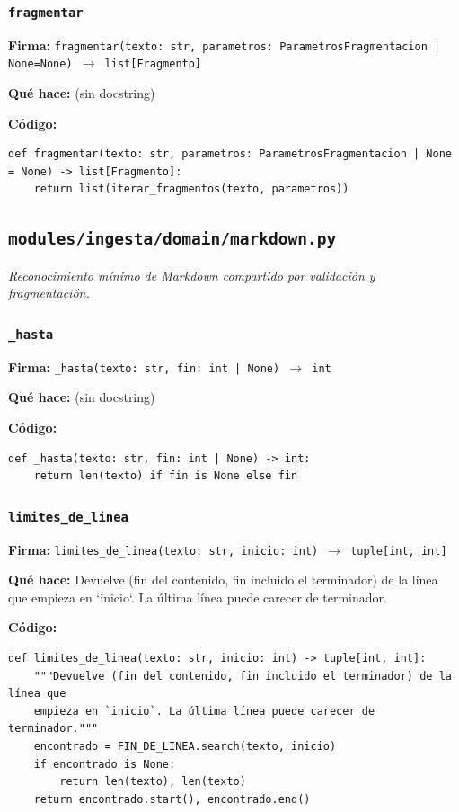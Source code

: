 \documentclass[11pt,a4paper]{article}
\begin{document}
\subsubsection*{\texttt{fragmentar}}
\textbf{Firma:} \texttt{fragmentar(texto: str, parametros: ParametrosFragmentacion | None=None) $\rightarrow$ list[Fragmento]}

\textbf{Qué hace:} (sin docstring)

\textbf{Código:}
\begin{lstlisting}
def fragmentar(texto: str, parametros: ParametrosFragmentacion | None = None) -> list[Fragmento]:
    return list(iterar_fragmentos(texto, parametros))
\end{lstlisting}

\subsection{\texttt{modules/ingesta/domain/markdown.py}}
\textit{Reconocimiento mínimo de Markdown compartido por validación y fragmentación.}

\subsubsection*{\texttt{\_hasta}}
\textbf{Firma:} \texttt{\_hasta(texto: str, fin: int | None) $\rightarrow$ int}

\textbf{Qué hace:} (sin docstring)

\textbf{Código:}
\begin{lstlisting}
def _hasta(texto: str, fin: int | None) -> int:
    return len(texto) if fin is None else fin
\end{lstlisting}

\subsubsection*{\texttt{limites\_de\_linea}}
\textbf{Firma:} \texttt{limites\_de\_linea(texto: str, inicio: int) $\rightarrow$ tuple[int, int]}

\textbf{Qué hace:} Devuelve (fin del contenido, fin incluido el terminador) de la línea que
empieza en `inicio`. La última línea puede carecer de terminador.

\textbf{Código:}
\begin{lstlisting}
def limites_de_linea(texto: str, inicio: int) -> tuple[int, int]:
    """Devuelve (fin del contenido, fin incluido el terminador) de la línea que
    empieza en `inicio`. La última línea puede carecer de terminador."""
    encontrado = FIN_DE_LINEA.search(texto, inicio)
    if encontrado is None:
        return len(texto), len(texto)
    return encontrado.start(), encontrado.end()
\end{lstlisting}
\end{document}
